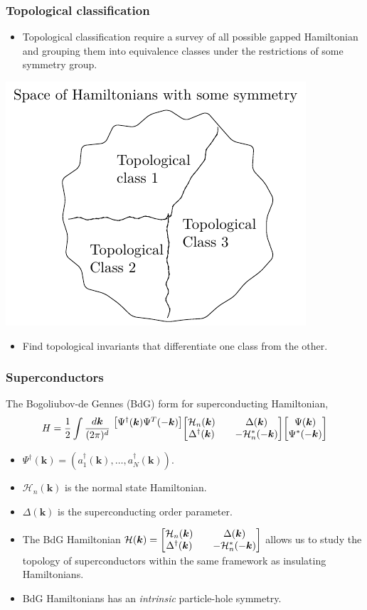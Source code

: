 \documentclass{beamer}
\newcommand{\mc}{\mathcal}
\renewcommand{\(}{\left(}
\renewcommand{\)}{\right)}
\renewcommand{\[}{\left[}
\renewcommand{\]}{\right]}
\begin{document}
\begin{frame}
    \frametitle{Topological classification}

    \begin{itemize}
        \item Topological classification require a survey of all possible gapped Hamiltonian and grouping them into equivalence classes under the restrictions of some symmetry group. 
    \end{itemize}
    \centering
    \includegraphics[]{hams_space.pdf}
    \begin{itemize}
        \item Find topological invariants that differentiate one class from the other. 
    \end{itemize}
\end{frame}

\begin{frame}
    \frametitle{Superconductors}
    The Bogoliubov-de Gennes (BdG) form for superconducting Hamiltonian, 
    \begin{align*}
        H =\frac{1}{2}\int \frac{d\bm k}{(2\pi)^{d}}  \  \mqty{\mqty[\Psi^\dagger(\bm k)  \Psi^T(-\bm k)] \\ \mbox{}}
        \mqty[\mc H_n(\bm k) && \Delta(\bm k) \\ 
        \Delta^\dagger (\bm k) && -\mc H^*_n(-\bm k)] \mqty[\Psi(\bm k) \\ 
        \Psi^*(-\bm k)]
    \end{align*}
    \begin{itemize}
        \item $\Psi^\dagger(\bm k) = (a^\dagger_1(\bm k), \dots, a^\dagger_N(\bm k))$.
        \item $\mc H_n(\bm k)$ is the normal state Hamiltonian.
        \item $\Delta(\bm k)$ is the superconducting order parameter.
        \item The BdG Hamiltonian $ \mc H(\bm k) = \mqty[\mc H_n(\bm k) && \Delta(\bm k) \\ 
        \Delta^\dagger (\bm k) && -\mc H^*_n(-\bm k)]$ allows us to study the topology of superconductors within the same framework as insulating Hamiltonians. 
        \item BdG Hamiltonians has an \emph{intrinsic} particle-hole symmetry. 
    \end{itemize}
\end{frame}
\end{document}
